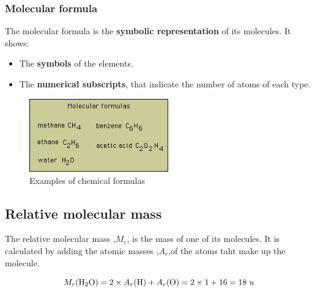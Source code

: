 \documentclass{article}
\begin{document}
			\subsubsection{Molecular formula}
				The molecular formula is the \textbf{symbolic representation} of its molecules. 
				It shows:

				\begin{itemize}
					\item The \textbf{symbols} of the elements.
					\item The \textbf{numerical subscripts}, that indicate the number of atoms of each type. 
				\end{itemize}

				\begin{figure}[htp]
					\centering
					\includegraphics[width=6cm]{formula.jpg}
					\caption{Examples of chemical formulas}
				\end{figure}

			\subsection{Relative molecular mass}
				The relative molecular mass ,\textbf{\textit{$M_{r}$}}, is the mass of one of its molecules.
				It is calculated by adding the atomic masses ,\textbf{\textit{$A_{r}$}},of the atoms taht make up the molecule.

				\[ M_{r}(\ce{H2O}) = 2 \times A_{r}(\ce{H}) + A_{r}(\ce{O}) = 2 \times 1 + 16 = 18\ u\]
			
\end{document}
